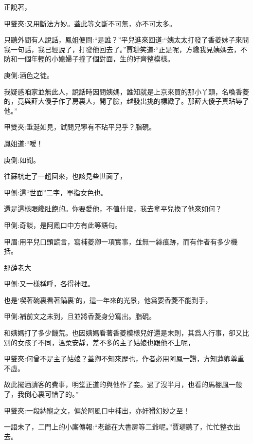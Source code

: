 \begin{parag}
    正說著，\begin{note}甲雙夾:又用斷法方妙。蓋此等文斷不可無，亦不可太多。\end{note}只聽外間有人說話，鳳姐便問:“是誰？”平兒進來回道:“姨太太打發了香菱妹子來問我一句話，我已經說了，打發他回去了。”賈璉笑道:“正是呢，方纔我見姨媽去，不防和一個年輕的小媳婦子撞了個對面，生的好齊整模樣。\begin{note}庚側:酒色之徒。\end{note}我疑惑咱家並無此人，說話時因問姨媽，誰知就是上京來買的那小丫頭，名喚香菱的，竟與薛大傻子作了房裏人，開了臉，越發出挑的標緻了。那薛大傻子真玷辱了他。”\begin{note}甲雙夾:垂涎如見，試問兄寧有不玷平兒乎？脂硯。\end{note}鳳姐道:“噯！\begin{note}庚側:如聞。\end{note}往蘇杭走了一趟回來，也該見些世面了，\begin{note}甲側:這“世面”二字，單指女色也。\end{note}還是這樣眼饞肚飽的。你要愛他，不值什麼，我去拿平兒換了他來如何？\begin{note}甲側:奇談，是阿鳳口中方有此等語句。\end{note}\begin{note}甲眉:用平兒口頭謊言，寫補菱卿一項實事，並無一絲痕跡，而有作者有多少機括。\end{note}那薛老大\begin{note}甲側:又一樣稱呼，各得神理。\end{note}也是‘喫著碗裏看著鍋裏’的，這一年來的光景，他爲要香菱不能到手，\begin{note}甲側:補前文之未到，且並將香菱身分寫出。脂硯。\end{note}和姨媽打了多少饑荒。也因姨媽看著香菱模樣兒好還是末則，其爲人行事，卻又比別的女孩子不同，溫柔安靜，差不多的主子姑娘也跟他不上呢，\begin{note}甲雙夾:何曾不是主子姑娘？蓋卿不知來歷也，作者必用阿鳳一讚，方知蓮卿尊重不虛。\end{note}故此擺酒請客的費事，明堂正道的與他作了妾。過了沒半月，也看的馬棚風一般了，我倒心裏可惜了的。”\begin{note}甲雙夾:一段納寵之文，偏於阿風口中補出，亦奸猾幻妙之至！\end{note}一語未了，二門上的小廝傳報:“老爺在大書房等二爺呢。”賈璉聽了，忙忙整衣出去。
\end{parag}


